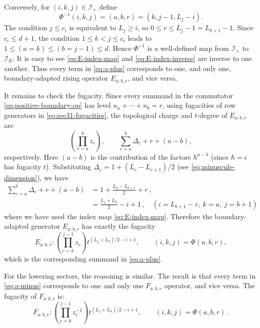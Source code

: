 \documentclass[12pt,a4paper]{article}
\begin{document}
Conversely, for $(i,k,j)\in\mathcal I_+$ define
\begin{equation}
 \Phi^{-1}(i,k,j)=(a,b,r)=(k,j-1,L_j-i).
 \label{eq:E-index-inverse}
\end{equation}
The condition $j\leq c_i$ is equivalent to $L_j\geq i$, so
$0\leq r\leq L_j-1=L_{b+1}-1$.  Since $c_i\leq d+1$, the condition $1\leq k<j\leq c_i$ leads to $1\leq (a=k)\leq(b= j-1)\leq d$. Hence $\Phi^{-1}$ is a well-defined map from $\mathcal I_+$ to $\mathcal I_E$. It is easy to see
\eqref{eq:E-index-map} and \eqref{eq:E-index-inverse} are inverse to one
another.  Thus every term in \eqref{eq:a-plus} corresponds to one,
and only one, boundary-adapted rising operator $E_{a:b,r}$, and vice versa.

It remains to check the fugacity. 
Since every summand in the commutator \eqref{eq:positive-boundary-op} has level
$n_a+\cdots+n_b=r$,  using fugacities of row generators in
\eqref{eq:sec31-fugacities}, the topological charge and $t$-degree of $E_{a:b,r}$ are
\begin{equation}
 \left(\prod_{c=a}^{b}z_c\right),\qquad
 \sum_{c=a}^{b}\Delta_c+r+(a-b),
 \label{eq:E-degree-before-simplification}
\end{equation}
respectively.  Here $(a-b)$ is the contribution of the factors $\hbar^{a-b}$ (since $\hbar=\epsilon$ has fugacity $t$).  Substituting
$\Delta_c=1+(L_c-L_{c+1})/2$ (see \eqref{eq:minuscule-dimension}), we have 
\begin{equation}
 \begin{aligned}
 \sum_{c=a}^{b}\Delta_c+r+(a-b)&=1+\frac{L_a-L_{b+1}}{2}+r\,,\\
 &= \frac{L_j+L_k}2-i+1\,, \quad (i=L_{b+1}-r,\ k=a,\ j=b+1)
 \end{aligned}
 \label{eq:E-degree-match}
\end{equation}
where we have used the index map \eqref{eq:E-index-map}.  Therefore the boundary-adapted generator $E_{a:b,r}$ has exactly the fugacity
\begin{equation}
 E_{a:b,r}:
 \left(\prod_{c=k}^{j-1}z_c\right)
 t^{(L_j+L_k)/2-i+1},
 \qquad (i,k,j)=\Phi(a,b,r),
 \label{eq:E-fugacity-match}
\end{equation}
which is the corresponding summand in \eqref{eq:a-plus}.  

For the lowering sectors, the reasoning is similar. The result is that every term in \eqref{eq:a-minus}
corresponds to one and only one $F_{a:b,r}$ operator, and vice versa. The fugacity of $F_{a:b,r}$ is:
\begin{equation}
 F_{a:b,r}:
 \left(\prod_{c=k}^{j-1}z_c^{-1}\right)
 t^{(L_j+L_k)/2-i+1},
 \qquad (i,k,j)=\Phi(a,b,r)\,.
 \label{eq:F-fugacity-match}
\end{equation}
\end{document}
